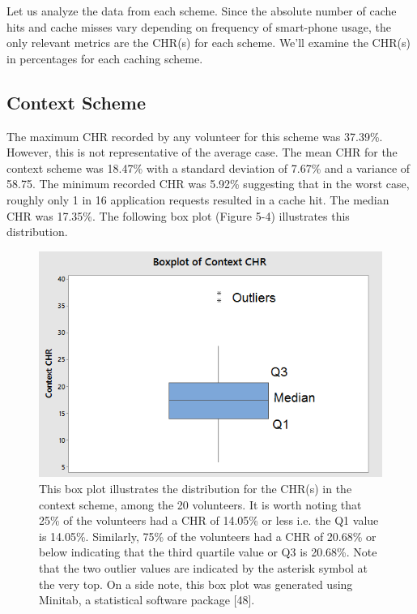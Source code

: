 \documentclass[12pt]{uthesis-v12}  %
\begin{document}
			Let us analyze the data from each scheme. Since the absolute number of cache hits and cache misses vary depending on frequency of smart-phone usage, the only relevant metrics are the CHR(s) for each scheme. We'll examine the CHR(s) in percentages for each caching scheme.
			
			\subsection{Context Scheme}
				The maximum CHR recorded by any volunteer for this scheme was 37.39\%. However, this is not representative of the average case. The mean CHR for the context scheme was 18.47\% with a standard deviation of 7.67\% and a variance of 58.75. The minimum recorded CHR was 5.92\% suggesting that in the worst case, roughly only 1 in 16 application requests resulted in a cache hit. The median CHR was 17.35\%. The following box plot (Figure 5-4) illustrates this distribution.
				
				\begin{figure}[h]
					\centering
					\includegraphics[width = 130mm]{images/contextScheme.png}
					\caption[Distribution of CHR for Context Scheme]{This box plot illustrates the distribution for the CHR(s) in the context scheme, among the 20 volunteers. It is worth noting that 25\% of the volunteers had a CHR of 14.05\% or less i.e. the Q1 value is 14.05\%. Similarly, 75\% of the volunteers had a CHR of 20.68\% or below indicating that the third quartile value or Q3 is 20.68\%. Note that the two outlier values are indicated by the asterisk symbol at the very top. On a side note, this box plot was generated using Minitab, a statistical software package [48].}
				\end{figure}
				
\end{document}
